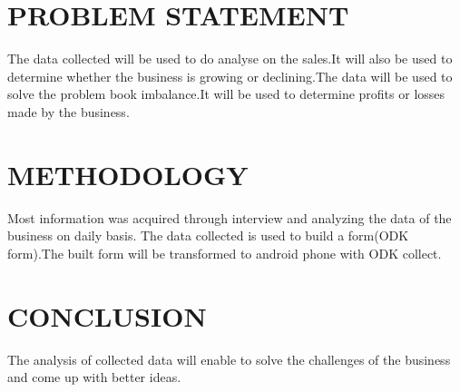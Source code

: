 \documentclass[12pt]{article}
\begin{document}
\section{PROBLEM STATEMENT}
The data collected will be used to do analyse on the sales.It will also be used to determine whether the business is growing or declining.The data will be used to solve the problem book imbalance.It will be used to determine profits or losses made by the business.

\section{METHODOLOGY}
Most information was acquired through interview  and analyzing the data of the business on daily basis.
The data collected is used to build a form(ODK form).The built form will be transformed to android phone with ODK collect.

\section{CONCLUSION}
The analysis of collected data will enable to solve the challenges of the business and come up with better ideas.
\end{document}
